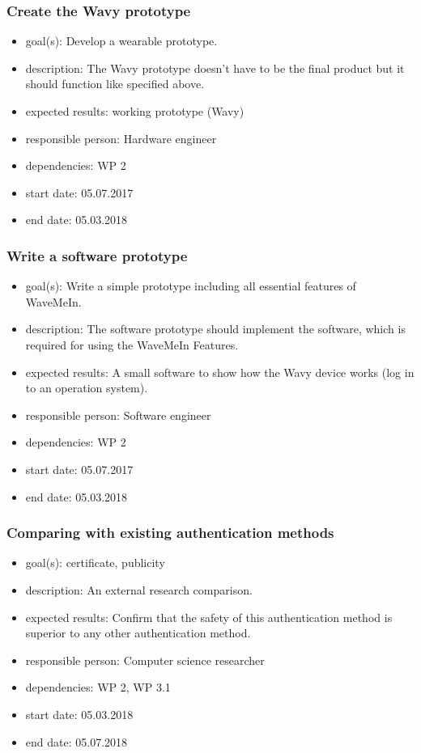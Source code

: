 \subsubsection{Create the Wavy prototype}
\begin{itemize}
 \item goal(s): Develop a wearable prototype.
 \item description: The Wavy prototype doesn’t have to be the final product but it should function like specified above.
 \item expected results: working prototype (Wavy)
 \item responsible person: Hardware engineer
 \item dependencies: WP 2
 \item start date: 05.07.2017
 \item end date: 05.03.2018
\end{itemize}

\subsubsection{Write a software prototype}
\begin{itemize}
 \item goal(s): Write a simple prototype including all essential features of WaveMeIn.
 \item description: The software prototype should implement the software, which is required for using the WaveMeIn Features.
 \item expected results: A small software to show how the Wavy device works (log in to an operation system).
 \item responsible person: Software engineer
 \item dependencies: WP 2
 \item start date: 05.07.2017
 \item end date: 05.03.2018
\end{itemize}

\subsubsection{Comparing with existing authentication methods}
\begin{itemize}
 \item goal(s): certificate, publicity
 \item description: An external research comparison.
 \item expected results: Confirm that the safety of this authentication method is superior to any other authentication method.
 \item responsible person: Computer science researcher
 \item dependencies: WP 2, WP 3.1
 \item start date: 05.03.2018
 \item end date: 05.07.2018
\end{itemize}
